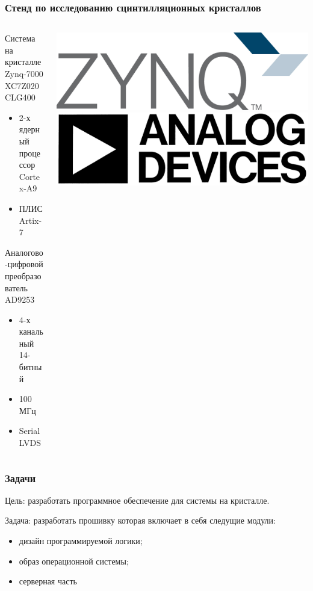 \documentclass[aspectratio=169]{beamer}
\begin{document}
\begin{frame}
\frametitle{Стенд по исследованию сцинтилляционных кристаллов}
    \begin{columns}
        \begin{column}{0.7\textwidth}
        Система на кристалле Zynq-7000 XC7Z020 CLG400
            \begin{itemize}
                \item 2-х ядерный процессор Cortex-A9
                \item ПЛИС Artix-7
            \end{itemize}
        Аналогово-цифровой преобразователь AD9253
            \begin{itemize}
                \item 4-х канальный 14-битный
                \item 100 МГц
                \item Serial LVDS
            \end{itemize}
        \end{column}
        \begin{column}{0.3\textwidth}
            \includegraphics[width=\textwidth]{Zynq.jpg}
            \includegraphics[width=\textwidth]{Analog_devices.jpg}
        \end{column}
    \end{columns}
\end{frame}

\begin{frame}
\frametitle{Задачи}
    Цель: разработать программное обеспечение для системы на кристалле.\par
    Задача: разработать прошивку которая включает в себя следущие модули:
    \begin{itemize}
        \item дизайн программируемой логики; 
        \item образ операционной системы;
        \item серверная часть
    \end{itemize}
\end{frame}
\end{document}
